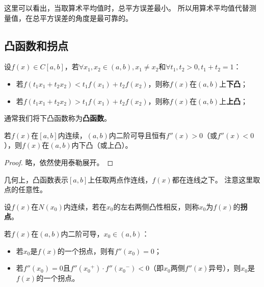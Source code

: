 这里可以看出，当取算术平均值时，总平方误差最小。
所以用算术平均值代替测量值，在总平方误差的角度是最可靠的。

\subsection{凸函数和拐点}

\begin{definition}[凸函数]
设$f\left( x \right) \in C\left[ a,b \right] $，若$\forall x_1,x_2\in \left( a,b \right) ,x_1\ne x_2$和$\forall t_1,t_2>0,t_1+t_2=1$：
\begin{itemize}
    \item 若$f\left( t_1x_1+t_2x_2 \right) <t_1f\left( x_1 \right) +t_2f\left( x_2 \right) $，则称$f\left( x \right) $在$\left( a,b \right) $上{\bf 下凸}；
    \item 若$f\left( t_1x_1+t_2x_2 \right) >t_1f\left( x_1 \right) +t_2f\left( x_2 \right) $，则称$f\left( x \right) $在$\left( a,b \right) $上{\bf 上凸}；
\end{itemize}
通常我们将下凸函数称为{\bf 凸函数}。
\end{definition}

\begin{theorem}
若$f\left( x \right) $在$\left[ a,b \right] $内连续，$\left( a,b \right) $内二阶可导且恒有$f''\left( x \right) >0$（或$f''\left( x \right) <0$），则$f\left( x \right) $在$\left( a,b \right) $内下凸（或上凸）。
\end{theorem}

\begin{proof}
略，依然使用泰勒展开。
\end{proof}

几何上，凸函数表示$\left[ a,b \right] $上任取两点作连线，$f\left( x \right) $都在连线之下。
注意这里取点的任意性。

\begin{definition}[拐点]
设$f\left( x \right) $在$N\left( x_0 \right) $内连续，若在$x_0$的左右两侧凸性相反，则称$x_0$为$f\left( x \right) $的{\bf 拐点}。
\end{definition}

\begin{theorem}
若$f\left( x \right) $在$\left( a,b \right) $内二阶可导，$x_0\in \left( a,b \right) $：
\begin{itemize}
    \item 若$x_0$是$f\left( x \right) $的一个拐点，则有$f''\left( x_0 \right) =0$；
    \item 若$f''\left( x_0 \right) =0$且$f''\left( {x_0}^+ \right) \cdot f''\left( {x_0}^- \right) <0$（即$x_0$两侧$f''\left( x \right) $异号），则$x_0$是$f\left( x \right) $的一个拐点。
\end{itemize}
\end{theorem}

